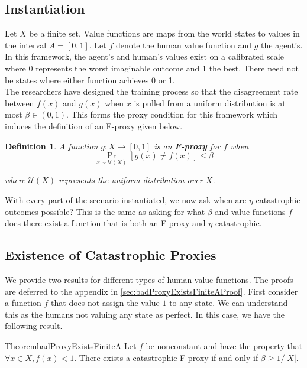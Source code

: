 \documentclass{article}
\newtheorem{Definition}{Definition}[section] \crefname{Definition}{Definition}{Definitions}
\begin{document}
\subsection{Instantiation}
Let $X$ be a finite set. Value functions are maps from the world states to values in the interval $A = [0,1]$. Let $f$ denote the human value function and $g$ the agent's. In this framework, the agent's and human's values exist on a calibrated scale where 0 represents the worst imaginable outcome and 1 the best. There need not be states where either function achieves 0 or 1.\\

The researchers have designed the training process so that the disagreement rate between $f(x)$ and $g(x)$ when $x$ is pulled from a uniform distribution is at most $\beta \in (0,1)$. This forms the proxy condition for this framework which induces the definition of an F-proxy given below.

\begin{Definition}\label{def:finiteProxy}
A function $g : X \rightarrow [0,1]$ is an \textbf{F-proxy} for $f$ when 
$$\Pr_{x \sim \mathcal U(X)}[g(x) \neq f(x)] \leq \beta$$

where $\mathcal U(X)$ represents the uniform distribution over $X$.
\end{Definition}

With every part of the scenario instantiated, we now ask when are $\eta$-catastrophic outcomes possible? This is the same as asking for what $\beta$ and value functions $f$ does there exist a function that is both an F-proxy and $\eta$-catastrophic.

\subsection{Existence of Catastrophic Proxies}
We provide two results for different types of human value functions. The proofs are deferred to the appendix in \cref{sec:badProxyExistsFiniteAProof}. First consider a function $f$ that does not assign the value $1$ to any state. We can understand this as the humans not valuing any state as perfect. In this case, we have the following result.

\begin{restatable}{Theorem}{badProxyExistsFiniteA}\label{thm:badProxyExistsFiniteA}
Let $f$ be nonconstant and have the property that $\forall x \in X, f(x) < 1$. There exists a catastrophic F-proxy if and only if $\beta \geq 1/|X|$.
\end{restatable}
\end{document}
